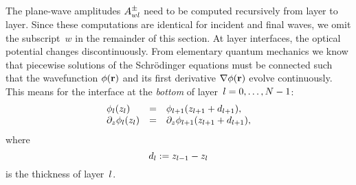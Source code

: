 The plane-wave amplitudes $A^\pm_{wl}$ need to be computed recursively
from layer to layer.
Since these computations are identical for incident and final waves,
we omit the subscript~$w$ in the remainder of this section.
At layer interfaces, the optical potential changes discontinuously.
From elementary quantum mechanics we know that
piecewise solutions of the Schrödinger equations must be connected
such that the wavefunction $\phi(\mathbf{r})$ and its first derivative
$\mathbf{\nabla}\phi(\mathbf{r})$ evolve continuously.
This means for the interface
at the \textit{bottom} of layer~$l=0,\ldots,N-1$:%
\begin{equation}\label{Econtcond}
  \begin{array}{lcl}
            \phi_l(z_l)&=&\phi_{l+1}(z_{l+1}+d_{l+1}),\\
            \partial_z\phi_l(z_l)&=&\partial_z\phi_{l+1}(z_{l+1}+d_{l+1}),
  \end{array}
\end{equation}
  where
\begin{equation}
  d_l:=z_{l-1}-z_{l}
\end{equation}
is the thickness of layer~$l$.

